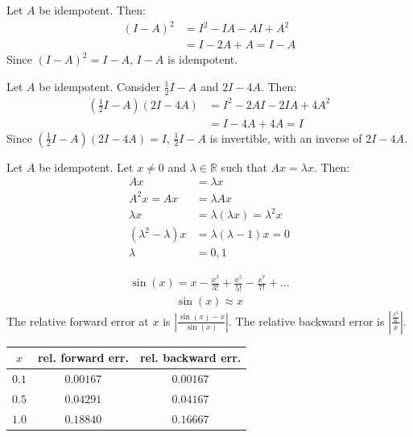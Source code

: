 \documentclass{article}
\begin{document}
Let $A$ be idempotent. Then:
\begin{align*}
    (I - A)^2 & = I^2 - IA - AI + A^2 \\
    & = I - 2A + A = I - A
\end{align*}
Since $(I - A)^2 = I - A$, $I - A$ is idempotent.

Let $A$ be idempotent. Consider $\frac{1}{2}I - A$ and $2I - 4A$. Then:
\begin{align*}
    \left(\frac{1}{2}I - A\right)(2I - 4A) & = I^2 - 2AI - 2IA + 4A^2 \\
    & = I - 4A + 4A = I
\end{align*}
Since $\left(\frac{1}{2}I - A\right)(2I - 4A) = I$, $\frac{1}{2}I - A$ is invertible, with an inverse of $2I - 4A$.

Let $A$ be idempotent. Let $x \neq 0$ and $\lambda \in \mathbb{R}$ such that $Ax = \lambda x$. Then:
\begin{align*}
    Ax & = \lambda x \\
    A^2x = Ax & = \lambda Ax \\
    \lambda x & = \lambda(\lambda x) = \lambda^2 x \\
    (\lambda^2 - \lambda)x & = \lambda(\lambda - 1)x = 0 \\
    \lambda & = 0, 1
\end{align*}
\clearpage

\problem{}
\begin{align*}
    \sin(x) = x - \frac{x^3}{3!} + \frac{x^5}{5!} - \frac{x^7}{7!} + \ldots
\end{align*}
\begin{align*}
    \sin(x) \approx x
\end{align*}
The relative forward error at $x$ is $\left|\frac{\sin(x) - x}{\sin(x)}\right|$. The relative backward error is $\left|\frac{\frac{x^3}{6}}{x}\right|$.

\begin{center}
\begin{tabular}{|c|c|c|}
    \hline
    $x$ & rel. forward err. & rel. backward err. \\
    \hline
    $0.1$ & $0.00167$ & $0.00167$ \\
    $0.5$ & $0.04291$ & $0.04167$ \\
    $1.0$ & $0.18840$ & $0.16667$ \\
    \hline
\end{tabular}
\end{center}
\end{document}
